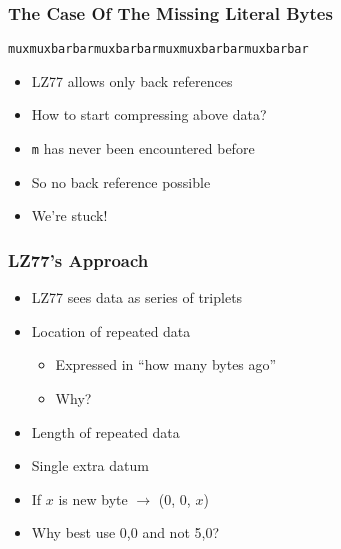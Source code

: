 \documentclass{../ucll-slides}
\begin{document}
\begin{frame}
  \frametitle{The Case Of The Missing Literal Bytes}
  \begin{center}
    \tt muxmuxbarbarmuxbarbarmuxmuxbarbarmuxbarbar
  \end{center}
  \vskip5mm
  \begin{itemize}
    \item LZ77 allows only back references
    \item How to start compressing above data?
    \item {\tt m} has never been encountered before
    \item So no back reference possible
    \item We're stuck!
  \end{itemize}
\end{frame}

\begin{frame}
  \frametitle{LZ77's Approach}
  \begin{itemize}
    \item LZ77 sees data as series of triplets
    \item<2-> Location of repeated data
              \begin{itemize}
                \item Expressed in ``how many bytes ago''
                \item Why? \cake
              \end{itemize}
    \item<3-> Length of repeated data
    \item<4-> Single extra datum
    \item<4-> If $x$ is new byte $\rightarrow$ (0, 0, $x$)
    \item<4-> Why best use 0,0 and not 5,0? \cake
  \end{itemize}
  \begin{center}
  \end{center}
\end{frame}
\end{document}
